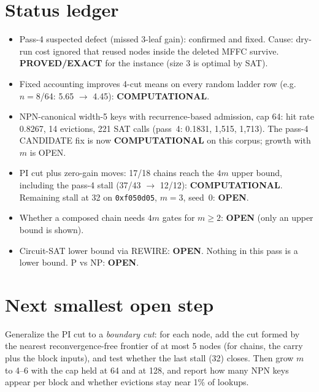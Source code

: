 \documentclass[11pt]{article}
\begin{document}
\section{Status ledger}
\begin{itemize}
\item Pass-4 suspected defect (missed 3-leaf gain): confirmed and fixed. Cause: dry-run cost ignored that reused nodes inside the deleted MFFC survive. \textbf{PROVED/EXACT} for the instance (size 3 is optimal by SAT).
\item Fixed accounting improves 4-cut means on every random ladder row (e.g.\ $n=8$/64: 5.65 $\to$ 4.45): \textbf{COMPUTATIONAL}.
\item NPN-canonical width-5 keys with recurrence-based admission, cap 64: hit rate 0.8267, 14 evictions, 221 SAT calls (pass~4: 0.1831, 1{,}515, 1{,}713). The pass-4 CANDIDATE fix is now \textbf{COMPUTATIONAL} on this corpus; growth with $m$ is OPEN.
\item PI cut plus zero-gain moves: 17/18 chains reach the $4m$ upper bound, including the pass-4 stall (37/43 $\to$ 12/12): \textbf{COMPUTATIONAL}. Remaining stall at 32 on \texttt{0xf050d05}, $m=3$, seed~0: \textbf{OPEN}.
\item Whether a composed chain needs $4m$ gates for $m\ge2$: \textbf{OPEN} (only an upper bound is shown).
\item Circuit-SAT lower bound via REWIRE: \textbf{OPEN}. Nothing in this pass is a lower bound. P vs NP: \textbf{OPEN}.
\end{itemize}

\section{Next smallest open step}
Generalize the PI cut to a \emph{boundary cut}: for each node, add the cut formed by the nearest reconvergence-free frontier of at most 5 nodes (for chains, the carry plus the block inputs), and test whether the last stall (32) closes. Then grow $m$ to 4--6 with the cap held at 64 and at 128, and report how many NPN keys appear per block and whether evictions stay near 1\% of lookups.

\end{document}
